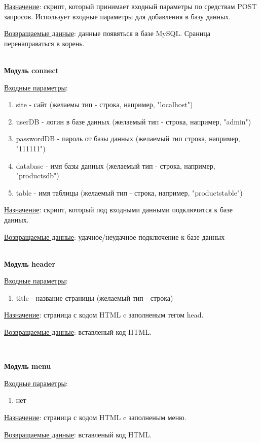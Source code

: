 \underline{Назначение}: скрипт, который принимает входный параметры по средствам POST запросов. Использует входные параметры для добавления в базу данных.

\underline{Возвращаемые данные}: данные появяться в базе MySQL. Сраница перенаправаться в корень.

\hspace{0pt}\\


\textbf{Модуль connect}

\underline{Входные параметры}:

\begin{enumerate}
    \item site - сайт (желаемы тип - строка, например,  "localhost")
    \item userDB - логин в базе данных (желаемый тип - строка, например, "admin")
    \item passwordDB - пароль от базы данных (желаемый тип строка, например, "111111")
    \item database - имя базы данных (желаемый тип - строка, например, "productsdb")
    \item table - имя таблицы (желаемый тип - строка, например, "productstable")
\end{enumerate}

\underline{Назначение}: скрипт, который под входными данными подключится к базе данных.

\underline{Возвращаемые данные}: удачное/неудачное подключение к базе данных

\hspace{0pt}\\


\textbf{Модуль header}

\underline{Входные параметры}:

\begin{enumerate}
    \item title - название страницы (желаемый тип - строка)
\end{enumerate}

\underline{Назначение}: страница с кодом HTML c заполненым тегом head.

\underline{Возвращаемые данные}: вставленый код HTML.

\hspace{0pt}\\


\newpage

\textbf{Модуль menu}

\underline{Входные параметры}:

\begin{enumerate}
    \item нет
\end{enumerate}

\underline{Назначение}: страница с кодом HTML c заполненым меню.

\underline{Возвращаемые данные}: вставленый код HTML.

\hspace{0pt}\\


\newpage